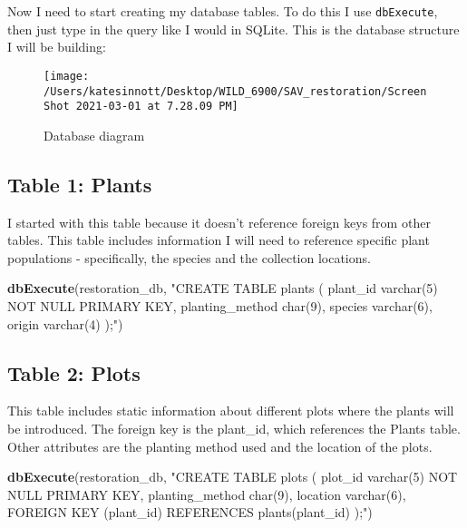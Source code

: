\documentclass[
]{book}
\newenvironment{Shaded}{\begin{snugshade}}{\end{snugshade}}
\newcommand{\KeywordTok}[1]{\textcolor[rgb]{0.13,0.29,0.53}{\textbf{#1}}}
\newcommand{\NormalTok}[1]{#1}
\newcommand{\StringTok}[1]{\textcolor[rgb]{0.31,0.60,0.02}{#1}}
\begin{document}
Now I need to start creating my database tables. To do this I use \texttt{dbExecute}, then
just type in the query like I would in SQLite. This is the database structure I will
be building:

\begin{figure}

{\centering \texttt{[image: /Users/katesinnott/Desktop/WILD\_6900/SAV\_restoration/Screen Shot 2021-03-01 at 7.28.09 PM]} 

}

\caption{Database diagram}\label{fig:diagram}
\end{figure}

\hypertarget{table-1-plants}{%
\subsection{Table 1: Plants}\label{table-1-plants}}

I started with this table because it doesn't reference foreign keys from other tables. This table includes information I will need to reference specific plant populations -
specifically, the species and the collection locations.

\begin{Shaded}
\begin{Highlighting}[]
\KeywordTok{dbExecute}\NormalTok{(restoration_db, }\StringTok{"CREATE TABLE plants (}
\StringTok{          plant_id varchar(5) NOT NULL PRIMARY KEY,}
\StringTok{          planting_method char(9),}
\StringTok{          species varchar(6),}
\StringTok{          origin varchar(4)}
\StringTok{          );"}\NormalTok{)}
\end{Highlighting}
\end{Shaded}

\hypertarget{table-2-plots}{%
\subsection{Table 2: Plots}\label{table-2-plots}}

This table includes static information about different plots where the plants will be introduced. The foreign key is the plant\_id, which references the Plants table. Other attributes are the planting method used and the location of the plots.

\begin{Shaded}
\begin{Highlighting}[]
\KeywordTok{dbExecute}\NormalTok{(restoration_db, }\StringTok{"CREATE TABLE plots (}
\StringTok{          plot_id varchar(5) NOT NULL PRIMARY KEY,}
\StringTok{          planting_method char(9),}
\StringTok{          location varchar(6), }
\StringTok{          FOREIGN KEY (plant_id) REFERENCES plants(plant_id)}
\StringTok{          );"}\NormalTok{)}
\end{Highlighting}
\end{Shaded}
\end{document}
